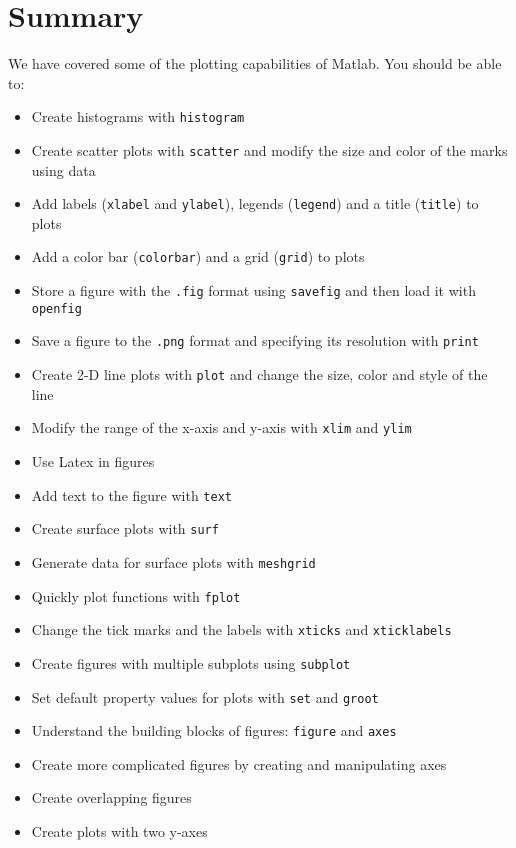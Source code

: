 \documentclass[12pt, a4paper]{article}
\begin{document}
\section{Summary}
\label{sec:orgfcd2119}
We have covered some of the plotting capabilities of Matlab.
You should be able to:
\begin{itemize}
\item Create histograms with \texttt{histogram}
\item Create scatter plots with \texttt{scatter} and modify the size and color of the marks using data
\item Add labels (\texttt{xlabel} and \texttt{ylabel}), legends (\texttt{legend}) and a title (\texttt{title}) to plots
\item Add a color bar (\texttt{colorbar}) and a grid (\texttt{grid}) to plots
\item Store a figure with the \texttt{.fig} format using \texttt{savefig} and then load it with \texttt{openfig}
\item Save a figure to the \texttt{.png} format and specifying its resolution with \texttt{print}
\item Create 2-D line plots with \texttt{plot} and change the size, color and style of the line
\item Modify the range of the x-axis and y-axis with \texttt{xlim} and \texttt{ylim}
\item Use Latex in figures
\item Add text to the figure with \texttt{text}
\item Create surface plots with \texttt{surf}
\item Generate data for surface plots with \texttt{meshgrid}
\item Quickly plot functions with \texttt{fplot}
\item Change the tick marks and the labels with \texttt{xticks} and \texttt{xticklabels}
\item Create figures with multiple subplots using \texttt{subplot}
\item Set default property values for plots with \texttt{set} and \texttt{groot}
\item Understand the building blocks of figures: \texttt{figure} and \texttt{axes}
\item Create more complicated figures by creating and manipulating axes
\item Create overlapping figures
\item Create plots with two y-axes
\end{itemize}
\end{document}

